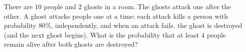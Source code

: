 There are $10$ people and $2$ ghosts in a room. The ghosts attack one after the other. A ghost attacks people one at a time: each attack kills a person with probability $80\%$, independently, and when an attack fails, the ghost is destroyed (and the next ghost begins). What is the probability that at least $4$ people remain alive after both ghosts are destroyed?
